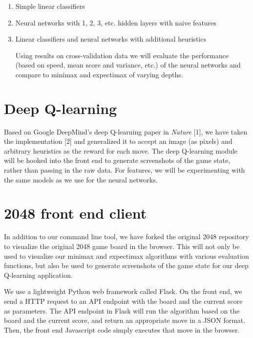 \documentclass[11pt]{article}
\begin{document}
\begin{enumerate}[1)]

\item Simple linear classifiers

\item Neural networks with 1, 2, 3, etc. hidden layers with naive features

\item Linear classifiers and neural networks with additional heuristics

Using results on cross-validation data we will evaluate the performance (based on speed, mean score and variance, etc.) of the neural networks and compare to minimax and expectimax of varying depths.

\end{enumerate}

\section{Deep Q-learning}

Based on Google DeepMind’s deep Q-learning paper in \emph{Nature} [1], we have taken the implementation [2] and generalized it to accept an image (as pixels) and arbitrary heuristics as the reward for each move. The deep Q-learning module will be hooked into the front end to generate screenshots of the game state, rather than passing in the raw data. For features, we will be experimenting with the same models as we use for the neural networks. 

\section{2048 front end client}

In addition to our command line tool, we have forked the original 2048 repository to visualize the original 2048 game board in the browser. This will not only be used to visualize our minimax and expectimax algorithms with various evaluation functions, but also be used to generate screenshots of the game state for our deep Q-learning application.

We use a lightweight Python web framework called Flask. On the front end, we send a HTTP request to an API endpoint with the board and the current score as parameters. The API endpoint in Flask will run the algorithm based on the board and the current score, and return an appropriate move in a JSON format. Then, the front end Javascript code simply executes that move in the browser.
\end{document}
